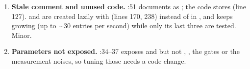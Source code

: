 \begin{review}
\begin{enumerate}[leftmargin=*]
  Worth checking against the identification data.
\item \textbf{Stale comment and unused code.} :51 documents  as ;
  the code stores  (line 127).  and  are created lazily with
   (lines 170, 238) instead of in , and  keeps growing (up to $\sim30$
  entries per second) while only its last three are tested. Minor.
\item \textbf{Parameters not exposed.} :34--37 exposes  and 
  but not , , the gates or the measurement noises, so tuning those needs a code
  change.
\end{enumerate}
\end{review}
\fussy
